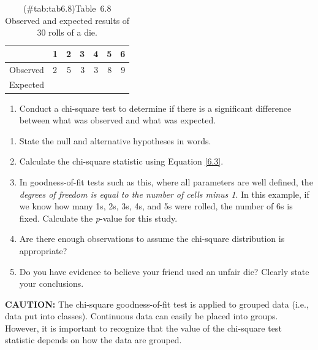 \documentclass[
]{report}
\providecommand{\tightlist}{%
  \setlength{\itemsep}{0pt}\setlength{\parskip}{0pt}}
\begin{document}
\begin{table}[!h]
\centering
\caption{(\#tab:tab6.8)Table~6.8 Observed and expected results of 30 rolls of a die.}
\centering
\begin{tabular}[t]{llrrrrr}
\toprule
  & 1 & 2 & 3 & 4 & 5 & 6\\
\midrule
Observed & 2 & 5 & 3 & 3 & 8 & 9\\
Expected &  &  &  &  &  & \\
\bottomrule
\end{tabular}
\end{table}

\begin{enumerate}
\def\labelenumi{\arabic{enumi}.}
\setcounter{enumi}{33}
\tightlist
\item
  Conduct a chi-square test to determine if there is a significant difference between what was observed and what was expected.\\
\end{enumerate}

\begin{enumerate}
\def\labelenumi{\alph{enumi}.}
\tightlist
\item
  State the null and alternative hypotheses in words.\\
\item
  Calculate the chi-square statistic using Equation \ref{6.3}.\\
\item
  In goodness-of-fit tests such as this, where all parameters are well defined, the \emph{degrees of freedom is equal to the number of cells minus 1}. In this example, if we know how many 1s, 2s, 3s, 4s, and 5s were rolled, the number of 6s is fixed. Calculate the \emph{p}-value for this study.\\
\item
  Are there enough observations to assume the chi-square distribution is appropriate?\\
\item
  Do you have evidence to believe your friend used an unfair die? Clearly state your conclusions.
\end{enumerate}

\large

\textbf{CAUTION:}
The chi-square goodness-of-fit test is applied to grouped data (i.e., data put into classes). Continuous data can easily be placed into groups. However, it is important to recognize that the value of the chi-square test statistic depends on how the data are grouped.
\normalsize
\end{document}
